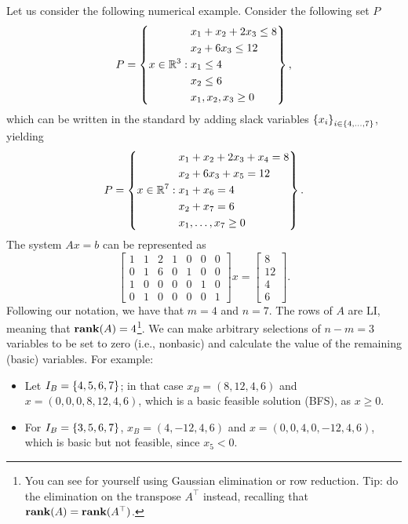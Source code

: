 Let us consider the following numerical example. Consider the following set $P$
%
\begin{equation}  \label{p1c3:eq:example_P}
	P = \left\{x \in \mathbb{R}^3 :  
		\begin{aligned}
			& x_1 + x_2 + 2x_3 \le 8 \\
			& x_2 + 6 x_3 \le 12 \\
			& x_1 \le 4 \\
			& x_2 \le 6 \\
			& x_1, x_2, x_3 \ge 0
		\end{aligned}
		\right\}, 	
\end{equation}
%
which can be written in the standard by adding slack variables $\left\{ x_i \right \}_{i \in \{4,\dots,7\}}$, yielding 
%
\begin{equation}  \label{p1c3:eq:example_P}
	P = \left\{x \in \mathbb{R}^7 :  
		\begin{aligned}
			& x_1 + x_2 + 2x_3 + x_4 = 8 \\
			& x_2 + 6 x_3 + x_5 = 12 \\
			& x_1 + x_6 = 4 \\
			& x_2 + x_7 =6 \\
			& x_1, \dots, x_7 \ge 0
		\end{aligned}
		\right\}. 	
\end{equation}
%
The system $Ax=b$ can be represented as 
%  
\begin{equation*}
	\begin{bmatrix}
		1 & 1 & 2 & 1 & 0 & 0 & 0 \\
		0 & 1 & 6 & 0 & 1 & 0 & 0 \\
		1 & 0 & 0 & 0 & 0 & 1 & 0 \\
		0 & 1 & 0 & 0 & 0 & 0 & 1
	\end{bmatrix} x =
	\begin{bmatrix}
		8  \\
		12 \\
		4  \\
		6   	
	\end{bmatrix}.
\end{equation*}
%
Following our notation, we have that $m = 4$ and $n = 7$. The rows of $A$ are LI, meaning that $\mathop{\bf rank}(A) = 4$\footnote{You can see for yourself using Gaussian elimination or row reduction. Tip: do the elimination on the transpose $A^\top$ instead, recalling that $\mathop{\bf rank}(A) = \mathop{\bf rank}(A^\top)$.}. We can make arbitrary selections of $n-m = 3$ variables to be set to zero (i.e., nonbasic) and calculate the value of the remaining (basic) variables. For example:
\begin{itemize}
	\item Let $I_B = \left\{ 4, 5, 6, 7 \right \}$; in that case $x_B = (8,12,4,6)$ and $x = (0,0,0,8,12,4,6)$, which is a basic feasible solution (BFS), as $x \geq 0$.
	\item For $I_B = \left\{ 3,5,6,7 \right \}$, $x_B = (4,-12,4,6)$ and $x = (0, 0, 4, 0, -12, 4, 6)$, which is basic but not feasible, since $x_5 < 0$.	
\end{itemize}


